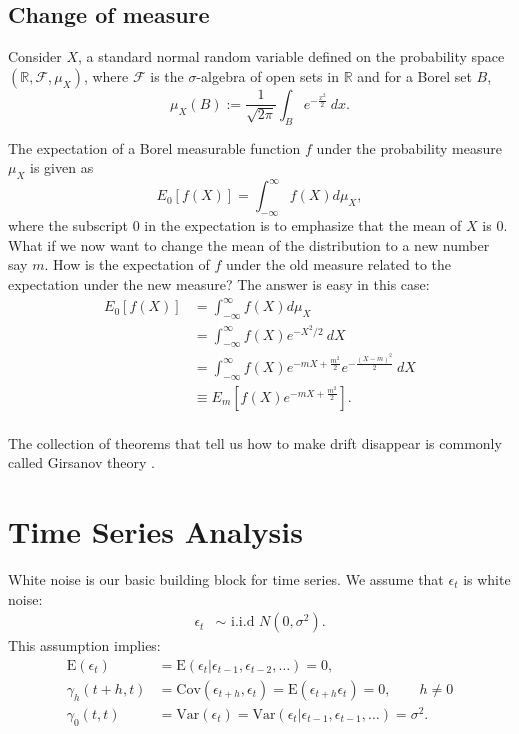 \documentclass{amsart}
\theoremstyle{plain}
\numberwithin{equation}{section}
\begin{document}
\subsection*{Change of measure}
Consider $X$, a standard normal 
random variable defined on the 
probability space $(\mathbb{R}, \mathcal{F}, \mu_X)$, where
$\mathcal{F}$ is the $\sigma$-algebra 
of open sets in $\mathbb{R}$ and
for a Borel set $B$,
\begin{equation*}
\mu_X(B) := \frac{1}{\sqrt{2 \pi} }
\int_{B} e^{-\frac{x^2}{2}} \: dx.
\end{equation*}

The expectation of a Borel measurable function 
$f$ under the probability measure 
$\mu_X$ is given as
\begin{equation*}
E_0[f(X)] = \int_{-\infty}^{\infty} f(X) d\mu_X,
\end{equation*}
where the subscript $0$ in the expectation is to 
emphasize that the mean of $X$ is $0$. What if
we now want to change the mean of the distribution
to a new number say $m$. How is the expectation of
$f$ under the old measure related to the 
expectation under the new measure?
The answer is easy in this case:
\begin{align*}
E_0[f(X)] &= \int_{-\infty}^{\infty} f(X) d\mu_X \\
					&= \int_{-\infty}^{\infty} f(X) e^{-X^2/2} \: dX \\
					&= \int_{-\infty}^{\infty} f(X) e^{-mX + \frac{m^2}{2}}e^{-\frac{(X-m)^2}{2}} \: dX \\
					&\equiv E_m\left[f(X)e^{-mX + \frac{m^2}{2}}\right].\\
\end{align*}


The collection of theorems that tell us how to make 
drift disappear is commonly called Girsanov theory
\cite[Ch.\ 13]{steele2001stochastic}.

\section{Time Series Analysis}
White noise is our basic building block
for time series. We assume that $\epsilon_t$ is white noise:
\begin{align*}
\epsilon_t &\sim \textrm{ i.i.d } N(0, \sigma^2).
\end{align*}
This assumption implies:
\begin{align*}
\mathrm{E}(\epsilon_t) 
&= \mathrm{E}(\epsilon_t | \epsilon_{t-1}, \epsilon_{t-2}, \ldots) = 0,\\
\gamma_{h}(t+h, t) &= \mathrm{Cov}(\epsilon_{t+h}, \epsilon_t) 
= \mathrm{E}(\epsilon_{t+h} \epsilon_t) = 0, \qquad h \neq 0\\
\gamma_{0}(t, t) &= \mathrm{Var}(\epsilon_t) 
= \mathrm{Var}(\epsilon_t| \epsilon_{t-1}, \epsilon_{t-1}, \ldots) 
= \sigma^2.
\end{align*}
\end{document}
